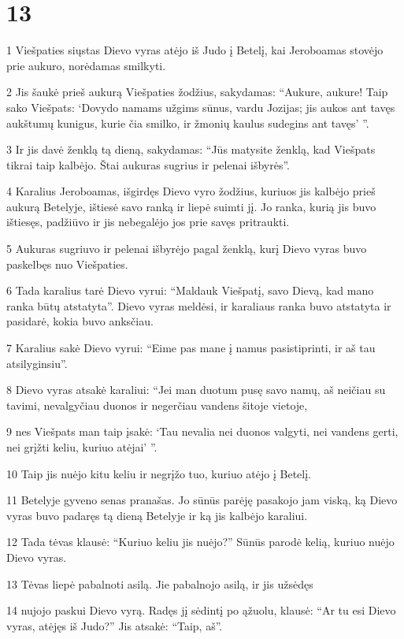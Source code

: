 \chapter{13}

\par 1 Viešpaties siųstas Dievo vyras atėjo iš Judo į Betelį, kai Jeroboamas stovėjo prie aukuro, norėdamas smilkyti. 
\par 2 Jis šaukė prieš aukurą Viešpaties žodžius, sakydamas: “Aukure, aukure! Taip sako Viešpats: ‘Dovydo namams užgims sūnus, vardu Jozijas; jis aukos ant tavęs aukštumų kunigus, kurie čia smilko, ir žmonių kaulus sudegins ant tavęs’ ”. 
\par 3 Ir jis davė ženklą tą dieną, sakydamas: “Jūs matysite ženklą, kad Viešpats tikrai taip kalbėjo. Štai aukuras sugrius ir pelenai išbyrės”. 
\par 4 Karalius Jeroboamas, išgirdęs Dievo vyro žodžius, kuriuos jis kalbėjo prieš aukurą Betelyje, ištiesė savo ranką ir liepė suimti jį. Jo ranka, kurią jis buvo ištiesęs, padžiūvo ir jis nebegalėjo jos prie savęs pritraukti. 
\par 5 Aukuras sugriuvo ir pelenai išbyrėjo pagal ženklą, kurį Dievo vyras buvo paskelbęs nuo Viešpaties. 
\par 6 Tada karalius tarė Dievo vyrui: “Maldauk Viešpatį, savo Dievą, kad mano ranka būtų atstatyta”. Dievo vyras meldėsi, ir karaliaus ranka buvo atstatyta ir pasidarė, kokia buvo anksčiau. 
\par 7 Karalius sakė Dievo vyrui: “Eime pas mane į namus pasistiprinti, ir aš tau atsilyginsiu”. 
\par 8 Dievo vyras atsakė karaliui: “Jei man duotum pusę savo namų, aš neičiau su tavimi, nevalgyčiau duonos ir negerčiau vandens šitoje vietoje, 
\par 9 nes Viešpats man taip įsakė: ‘Tau nevalia nei duonos valgyti, nei vandens gerti, nei grįžti keliu, kuriuo atėjai’ ”. 
\par 10 Taip jis nuėjo kitu keliu ir negrįžo tuo, kuriuo atėjo į Betelį. 
\par 11 Betelyje gyveno senas pranašas. Jo sūnūs parėję pasakojo jam viską, ką Dievo vyras buvo padaręs tą dieną Betelyje ir ką jis kalbėjo karaliui. 
\par 12 Tada tėvas klausė: “Kuriuo keliu jis nuėjo?” Sūnūs parodė kelią, kuriuo nuėjo Dievo vyras. 
\par 13 Tėvas liepė pabalnoti asilą. Jie pabalnojo asilą, ir jis užsėdęs 
\par 14 nujojo paskui Dievo vyrą. Radęs jį sėdintį po ąžuolu, klausė: “Ar tu esi Dievo vyras, atėjęs iš Judo?” Jis atsakė: “Taip, aš”. 
